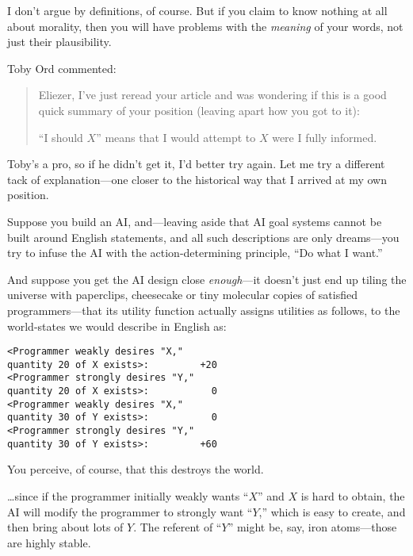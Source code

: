 {
 I don't argue by definitions, of course. But if
you claim to know nothing at all about morality, then you will have
problems with the \textit{meaning} of your words, not just their
plausibility.}

\myendsectiontext


\bigskip


{
 Toby Ord commented:}

\begin{quotation}
{
 Eliezer, I've just reread your article and was
wondering if this is a good quick summary of your position (leaving
apart how you got to it):}

{
 ``I should $X$'' means that I
  would attempt to $X$ were I fully informed.}
\end{quotation}

{
 Toby's a pro, so if he didn't get
it, I'd better try again. Let me try a different tack
of explanation---one closer to the historical way that I arrived at my
own position.}

{
 Suppose you build an AI, and---leaving aside that AI goal systems
cannot be built around English statements, and all such descriptions
are only dreams---you try to infuse the AI with the action-determining
principle, ``Do what I want.''}

{
 And suppose you get the AI design close \textit{enough}{}---it
doesn't just end up tiling the universe with
paperclips, cheesecake or tiny molecular copies of satisfied
programmers---that its utility function actually assigns utilities as
follows, to the world-states we would describe in English as:}

\begin{verbatim}
<Programmer weakly desires "X,"
quantity 20 of X exists>:         +20
<Programmer strongly desires "Y,"
quantity 20 of X exists>:           0
<Programmer weakly desires "X,"
quantity 30 of Y exists>:           0
<Programmer strongly desires "Y,"
quantity 30 of Y exists>:         +60
\end{verbatim}


{
 You perceive, of course, that this destroys the world.}

{
 \ldots since if the programmer initially weakly wants
``$X$'' and $X$ is hard to obtain, the
AI will modify the programmer to strongly want
``$Y$,'' which is easy to create, and
then bring about lots of $Y$. The referent of ``$Y$''
might be, say, iron atoms---those are highly
stable.}

